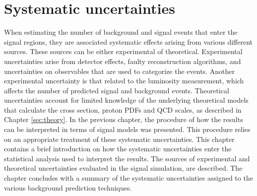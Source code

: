 \chapter{Systematic uncertainties}\label{sec:systs}
\noindent\justify
When estimating the number of background and signal events that enter the signal regions, they are associated systematic effects arising from various different sources. 
These sources can be either experimental of theoretical. 
Experimental uncertainties arise from detector effects, faulty reconstruction algorithms, and uncertainties on observables that are used to categorize the events. 
Another experimental uncertainty is that related to the luminosity measurement, which affects the number of predicted signal and background events. 
Theoretical uncertainties account for limited knowledge of the underlying theoretical models that calculate the cross section, proton PDFs and QCD scales, as described in Chapter \ref{sec:theory}. 
\newpara
\noindent\justify
In the previous chapter, the procedure of how the results can be interpreted in terms of signal models was presented. 
This procedure relies on an appropriate treatment of these systematic uncertainties. 
This chapter contains a brief introduction on how the systematic uncertainties enter the statistical analysis used to interpret the results. 
The sources of experimental and theoretical uncertainties evaluated in the signal simulation, are described. 
The chapter concludes with a summary of the systematic uncertainties assigned to the various background prediction techniques. 
\newpage

